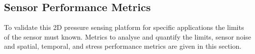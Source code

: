 





\subsection{Sensor Performance Metrics}\label{sec:Sensor Performance Metrics2}
To validate this 2D pressure sensing platform for specific applications the limits of the sensor must known. Metrics to analyse and quantify the limits, sensor noise and spatial, temporal, and stress performance metrics are given in this section.

